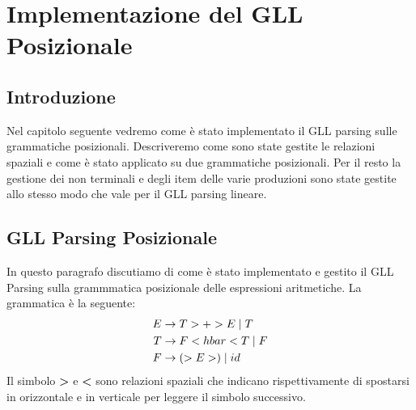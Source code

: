 \chapter{Implementazione del GLL Posizionale}
\section{Introduzione}
Nel capitolo seguente vedremo come è stato implementato il GLL parsing sulle grammatiche posizionali. Descriveremo come sono state gestite le relazioni spaziali e come è stato applicato su due grammatiche posizionali. Per il resto la gestione dei non terminali e degli item delle varie produzioni sono state gestite allo stesso modo che vale per il GLL parsing lineare.
\section{GLL Parsing Posizionale}
In questo paragrafo discutiamo di come è stato implementato e gestito il GLL Parsing sulla grammmatica posizionale delle espressioni aritmetiche. La grammatica è la seguente:
\begin{align}\label{gramPos1}
E & \to T > + > E \mid  T \notag \\
T & \to F < hbar < T \mid F \notag \\
F & \to ( > E > ) \mid id 
\end{align}
Il simbolo \textbf{>} e \textbf{<} sono relazioni spaziali che indicano rispettivamente di spostarsi in orizzontale e in verticale per leggere il simbolo successivo.
